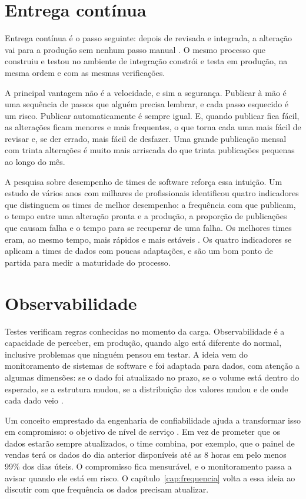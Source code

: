 \section{Entrega contínua}
\label{sec:cd}

Entrega contínua é o passo seguinte: depois de revisada e integrada, a alteração vai para a
produção sem nenhum passo manual \parencite{humble2010}. O mesmo processo que construiu e
testou no ambiente de integração constrói e testa em produção, na mesma ordem e com as mesmas
verificações.

A principal vantagem não é a velocidade, e sim a segurança. Publicar à mão é uma sequência de
passos que alguém precisa lembrar, e cada passo esquecido é um risco. Publicar
automaticamente é sempre igual. E, quando publicar fica fácil, as alterações ficam menores e
mais frequentes, o que torna cada uma mais fácil de revisar e, se der errado, mais fácil de
desfazer. Uma grande publicação mensal com trinta alterações é muito mais arriscada do que
trinta publicações pequenas ao longo do mês.

A pesquisa sobre desempenho de times de software reforça essa intuição. Um estudo de vários
anos com milhares de profissionais identificou quatro indicadores que distinguem os times de
melhor desempenho: a frequência com que publicam, o tempo entre uma alteração pronta e a
produção, a proporção de publicações que causam falha e o tempo para se recuperar de uma
falha. Os melhores times eram, ao mesmo tempo, mais rápidos e mais estáveis
\parencite{forsgren2018}. Os quatro indicadores se aplicam a times de dados com poucas
adaptações, e são um bom ponto de partida para medir a maturidade do processo.

\section{Observabilidade}
\label{sec:observabilidade}

Testes verificam regras conhecidas no momento da carga. Observabilidade é a capacidade de
perceber, em produção, quando algo está diferente do normal, inclusive problemas que ninguém
pensou em testar. A ideia vem do monitoramento de sistemas de software e foi adaptada para
dados, com atenção a algumas dimensões: se o dado foi atualizado no prazo, se o volume está
dentro do esperado, se a estrutura mudou, se a distribuição dos valores mudou e de onde cada
dado veio \parencite{moses2022}.

Um conceito emprestado da engenharia de confiabilidade ajuda a transformar isso em
compromisso: o objetivo de nível de serviço \parencite{beyer2016}. Em vez de prometer que os
dados estarão sempre atualizados, o time combina, por exemplo, que o painel de vendas terá
os dados do dia anterior disponíveis até as 8 horas em pelo menos 99\% dos dias úteis. O
compromisso fica mensurável, e o monitoramento passa a avisar quando ele está em risco. O
capítulo~\ref{cap:frequencia} volta a essa ideia ao discutir com que frequência os dados
precisam atualizar.

